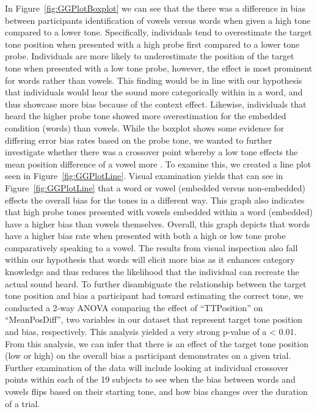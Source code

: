 \documentclass[
  man,floatsintext]{apa6}
\begin{document}
In Figure~\ref{fig:GGPlotBoxplot} we can see that the there was a difference in bias between participants identification of vowels versus words when given a high tone compared to a lower tone. Specifically, individuals tend to overestimate the target tone position when presented with a high probe first compared to a lower tone probe. Individuals are more likely to underestimate the position of the target tone when presented with a low tone probe, however, the effect is most prominent for words rather than vowels. This finding would be in line with our hypothesis that individuals would hear the sound more categorically within in a word, and thus showcase more bias because of the context effect. Likewise, individuals that heard the higher probe tone showed more overestimation for the embedded condition (words) than vowels. While the boxplot shows some evidence for differing error bias rates based on the probe tone, we wanted to further investigate whether there was a crossover point whereby a low tone effects the mean position difference of a vowel more . To examine this, we created a line plot seen in Figure~\ref{fig:GGPlotLine}. Visual examination yields that can see in Figure~\ref{fig:GGPlotLine} that a word or vowel (embedded versus non-embedded) effects the overall bias for the tones in a different way. This graph also indicates that high probe tones presented with vowels embedded within a word (embedded) have a higher bias than vowels themselves. Overall, this graph depicts that words have a higher bias rate when presented with both a high or low tone probe comparatively speaking to a vowel. The results from visual inspection also fall within our hypothesis that words will elicit more bias as it enhances category knowledge and thus reduces the likelihood that the individual can recreate the actual sound heard. To further disambiguate the relationship between the target tone position and bias a participant had toward estimating the correct tone, we conducted a 2-way ANOVA comparing the effect of ``TTPosition'' on ``MeanPosDiff'', two variables in our dataset that represent target tone position and bias, respectively. This analysis yielded a very strong p-value of a \textless{} 0.01. From this analysis, we can infer that there is an effect of the target tone position (low or high) on the overall bias a participant demonstrates on a given trial. Further examination of the data will include looking at individual crossover points within each of the 19 subjects to see when the bias between words and vowels flips based on their starting tone, and how bias changes over the duration of a trial.
\end{document}
